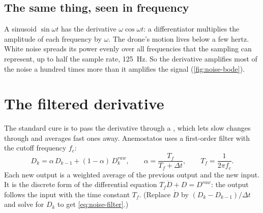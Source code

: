 \subsection{The same thing, seen in frequency}
A sinusoid $\sin\omega t$ has the derivative $\omega\cos\omega t$: a differentiator multiplies the amplitude of each frequency by $\omega$. The drone's motion lives below a few hertz. White noise spreads its power evenly over all frequencies that the sampling can represent, up to half the sample rate, \SI{125}{Hz}. So the derivative amplifies most of the noise a hundred times more than it amplifies the signal (\cref{fig:noise-bode}).


\section{The filtered derivative}

The standard cure is to pass the derivative through a , which lets slow changes through and averages fast ones away. Anemostatos uses a first-order filter with the cutoff frequency $f_c$:
\begin{equation}\label{eq:noise-filter}
  D_k = \alpha\,D_{k-1} + (1 - \alpha)\,D^{raw}_k,\qquad
  \alpha = \frac{T_f}{T_f + \Delta t},\qquad T_f = \frac{1}{2\pi f_c}.
\end{equation}
Each new output is a weighted average of the previous output and the new input. It is the discrete form of the differential equation $T_f\dot D + D = D^{raw}$: the output follows the input with the time constant $T_f$. (Replace $\dot D$ by $(D_k - D_{k-1})/\Delta t$ and solve for $D_k$ to get \cref{eq:noise-filter}.)

